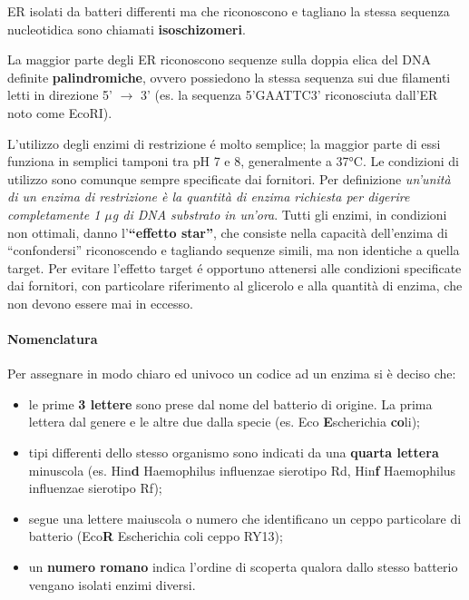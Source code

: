 \documentclass[]{article}
\begin{document}
ER isolati da batteri differenti ma che riconoscono e tagliano la stessa
sequenza nucleotidica sono chiamati \textbf{isoschizomeri}.

La maggior parte degli ER riconoscono sequenze sulla doppia elica del
DNA definite \textbf{palindromiche}, ovvero possiedono la stessa
sequenza sui due filamenti letti in direzione 5' \(\rightarrow\) 3' (es.
la sequenza 5'GAATTC3' riconosciuta dall'ER noto come EcoRI).

L'utilizzo degli enzimi di restrizione é molto semplice; la maggior
parte di essi funziona in semplici tamponi tra pH 7 e 8, generalmente a
37°C. Le condizioni di utilizzo sono comunque sempre specificate dai
fornitori. Per definizione \emph{un'unità di un enzima di restrizione è
la quantità di enzima richiesta per digerire completamente 1 \(\mu\)g di
DNA substrato in un'ora}. Tutti gli enzimi, in condizioni non ottimali,
danno l'\textbf{``effetto star''}, che consiste nella capacità
dell'enzima di ``confondersi'' riconoscendo e tagliando sequenze simili,
ma non identiche a quella target. Per evitare l'effetto target é
opportuno attenersi alle condizioni specificate dai fornitori, con
particolare riferimento al glicerolo e alla quantità di enzima, che non
devono essere mai in eccesso.

\paragraph{Nomenclatura}\label{nomenclatura}

Per assegnare in modo chiaro ed univoco un codice ad un enzima si è
deciso che:

\begin{itemize}
\itemsep1pt\parskip0pt
\item
  le prime \textbf{3 lettere} sono prese dal nome del batterio di
  origine. La prima lettera dal genere e le altre due dalla specie (es.
  Eco \textbf{E}scherichia \textbf{co}li);
\item
  tipi differenti dello stesso organismo sono indicati da una
  \textbf{quarta lettera} minuscola (es. Hin\textbf{d} Haemophilus
  influenzae sierotipo Rd, Hin\textbf{f} Haemophilus influenzae
  sierotipo Rf);
\item
  segue una lettere maiuscola o numero che identificano un ceppo
  particolare di batterio (Eco\textbf{R} Escherichia coli ceppo RY13);
\item
  un \textbf{numero romano} indica l'ordine di scoperta qualora dallo
  stesso batterio vengano isolati enzimi diversi.
\end{itemize}
\end{document}
